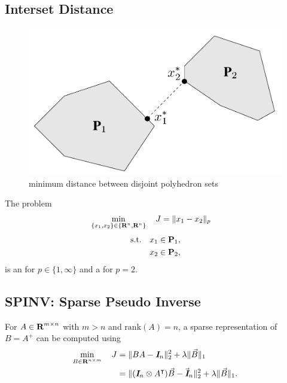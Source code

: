 \documentclass{article}
\begin{document}

    \subsection{Interset Distance}

    \begin{figure}[h!]
        \centering
        \includegraphics[width=.5\textwidth]{./figs/misc/dist.png}
        \caption{minimum distance between disjoint polyhedron sets}
        \label{fig:dist}
    \end{figure}

    The problem
    \begin{align}
        \min_{\{x_1,x_2\}\in\{\textbf{R}^n,\textbf{R}^n\}}\quad J &= \|x_1-x_2\|_p
    \end{align}
    \begin{align*}
        \text{s.t.}\quad x_1&\in\textbf{P}_1,\\
        x_2&\in\textbf{P}_2,
    \end{align*}
    is an \LP for $p\in\{1,\infty\}$ and a \QP for $p=2$.

\subsection{SPINV: Sparse Pseudo Inverse}

    For $A\in\textbf{R}^{m\times n}$ with $m>n$ and $\mathrm{rank}(A)=n$, 
    a sparse representation of 
    $B=A^+$ 
    can be computed using \cite{spinv}
    \begin{align}
        \min_{B\in\textbf{R}^{n\times m}}\quad
        J
        &=
            \|BA-\emph{\textbf{I}} _n\|_2^2
        +
            \lambda\| \vec{B}\|_1
        \\
        &=
            \|(\emph{\textbf{I}} _n\otimes A^\intercal)\vec{B}-\vec{\emph{\textbf{I}}}_n\|_2^2
        +
            \lambda\|\vec{B}\|_1.\nonumber
    \end{align}

\end{document}
